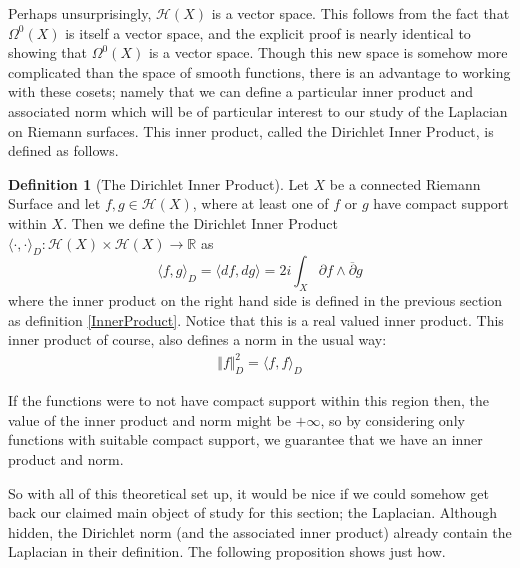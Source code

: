 \documentclass[11pt]{report}
\theoremstyle{definition}
\newtheorem{defn}[thm]{Definition}
\begin{document}
Perhaps unsurprisingly, $\mathcal{H}(X)$ is a vector space. This follows from the fact that $\Omega^0(X)$ is itself a vector space, and the explicit proof is nearly identical to showing that $\Omega^0(X)$ is a vector space. Though this new space is somehow more complicated than the space of smooth functions, there is an advantage to working with these cosets; namely that we can define a particular inner product and associated norm which will be of particular interest to our study of the Laplacian on Riemann surfaces. This inner product, called the Dirichlet Inner Product, is defined as follows.

\begin{defn}[The Dirichlet Inner Product]\label{dInnerProduct}
  Let $X$ be a connected Riemann Surface and let $f, g \in \mathcal{H}(X)$, where at least one of $f$ or $g$ have compact support within $X$. Then we define the Dirichlet Inner Product $\langle \cdot, \cdot \rangle_D : \mathcal{H}(X) \times \mathcal{H}(X) \rightarrow \mathbb{R}$ as 
  \[
    \langle f, g \rangle_D =\langle df, dg \rangle = 2i \int_X \partial f \wedge \overline{\partial} g 
  \]
  where the inner product on the right hand side is defined in the previous section as definition \ref{InnerProduct}. Notice that this is a real valued inner product.
  This inner product of course, also defines a norm in the usual way:
  \begin{align*}
    \Vert f\Vert _D^2 = \langle f, f \rangle_D
  \end{align*}
\end{defn}

If the functions were to not have compact support within this region then, the value of the inner product and norm might be $+\infty$, so by considering only functions with suitable compact support, we guarantee that we have an inner product and norm. 

So with all of this theoretical set up, it would be nice if we could somehow get back our claimed main object of study for this section; the Laplacian. Although hidden, the Dirichlet norm (and the associated inner product) already contain the Laplacian in their definition. The following proposition shows just how.
\end{document}
